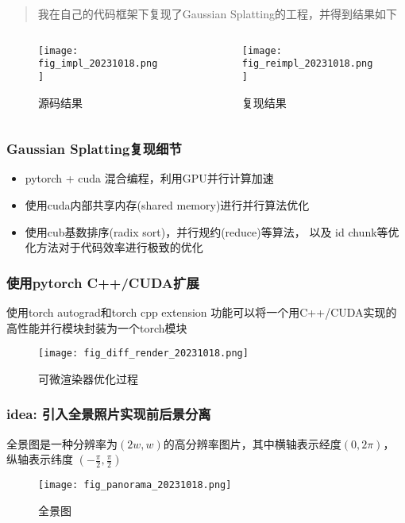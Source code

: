\begin{frame}
    \begin{quote}
        我在自己的代码框架下复现了Gaussian Splatting的工程，并得到结果如下
    \end{quote}
    \begin{columns}[c]
        \begin{column}{0.48\textwidth}
            \begin{figure}
                \texttt{[image: fig\_impl\_20231018.png]}
                \caption{源码结果}
            \end{figure}
        \end{column}
        \begin{column}{0.48\textwidth}
            \begin{figure}
                \texttt{[image: fig\_reimpl\_20231018.png]}
                \caption{复现结果}
            \end{figure}
        \end{column}
    \end{columns}
\end{frame}

\begin{frame}
    \frametitle{Gaussian Splatting复现细节}
    \begin{itemize}
        \item pytorch + cuda 混合编程，利用GPU并行计算加速
        \item 使用cuda内部共享内存(shared memory)进行并行算法优化
        \item 使用cub基数排序(radix sort)，并行规约(reduce)等算法，
            以及 id chunk等优化方法对于代码效率进行极致的优化
    \end{itemize}
\end{frame}

\begin{frame}
    \frametitle{使用pytorch C++/CUDA扩展}
    使用torch autograd和torch cpp extension 功能可以将一个用C++/CUDA实现的
    高性能并行模块封装为一个torch模块
    \begin{figure}
        \texttt{[image: fig\_diff\_render\_20231018.png]}
        \caption[short]{可微渲染器优化过程}
    \end{figure}
\end{frame}

\begin{frame}
    \frametitle{idea: 引入全景照片实现前后景分离}
    全景图是一种分辨率为$(2w,w)$的高分辨率图片，其中横轴表示经度$(0,2\pi)$，
    纵轴表示纬度 $(-\frac{\pi}{2},\frac{\pi}{2})$
    \begin{figure}
        \texttt{[image: fig\_panorama\_20231018.png]}
        \caption[short]{全景图}
    \end{figure}
\end{frame}

